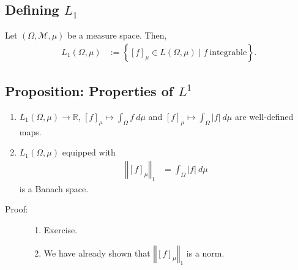 \documentclass[9pt]{extarticle}
\newcommand{\R}{\mathbb{R}}
\newcommand{\norm}[1]{\left\Vert #1 \right\Vert}
\begin{document}
  \subsection{Defining $L_1$}%
  Let $(\Omega,\mathcal{M},\mu)$ be a measure space. Then,
  \begin{align*}
    L_1(\Omega,\mu) &:= \left\{[f]_\mu\in L(\Omega,\mu)\mid f~\text{integrable}\right\}.
  \end{align*}
  \subsection{Proposition: Properties of $L^1$}%
  \begin{enumerate}[(1)]
    \item $L_1(\Omega,\mu)\rightarrow \R$, $[f]_\mu \mapsto \int_{\Omega}f~d\mu$ and $[f]_{\mu}\mapsto \int_{\Omega}|f|~d\mu$ are well-defined maps.
    \item $L_1(\Omega,\mu)$ equipped with
      \begin{align*}
        \norm{[f]_\mu}_1 &= \int_{\Omega}|f|~d\mu
      \end{align*}
      is a Banach space.
  \end{enumerate}
  \begin{description}
    \item[Proof:] \hfill
      \begin{enumerate}[(1)]
        \item Exercise.
        \item We have already shown that $\norm{[f]_\mu}_1$ is a norm.
      \end{enumerate}
  \end{description}
\end{document}
